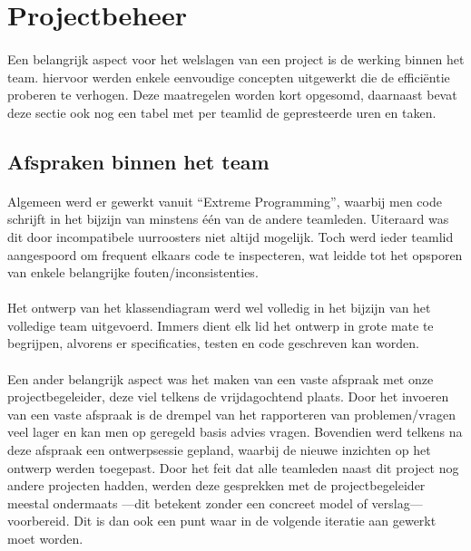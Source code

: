 \section{Projectbeheer}
\label{projectbeheer}
\paragraph{}
Een belangrijk aspect voor het welslagen van een project is de werking binnen het team. hiervoor werden enkele eenvoudige concepten uitgewerkt die de effici\"entie proberen te verhogen. Deze maatregelen worden kort opgesomd, daarnaast bevat deze sectie ook nog een tabel met per teamlid de gepresteerde uren en taken.
\subsection{Afspraken binnen het team}
\paragraph{}
Algemeen werd er gewerkt vanuit ``Extreme Programming'', waarbij men code schrijft in het bijzijn van minstens \'e\'en van de andere teamleden. Uiteraard was dit door incompatibele uurroosters niet altijd mogelijk. Toch werd ieder teamlid aangespoord om frequent elkaars code te inspecteren, wat leidde tot het opsporen van enkele belangrijke fouten/inconsistenties.
\paragraph{}
Het ontwerp van het klassendiagram werd wel volledig in het bijzijn van het volledige team uitgevoerd. Immers dient elk lid het ontwerp in grote mate te begrijpen, alvorens er specificaties, testen en code geschreven kan worden.
\paragraph{}
Een ander belangrijk aspect was het maken van een vaste afspraak met onze projectbegeleider, deze viel telkens de vrijdagochtend plaats. Door het invoeren van een vaste afspraak is de drempel van het rapporteren van problemen/vragen veel lager en kan men op geregeld basis advies vragen. Bovendien werd telkens na deze afspraak een ontwerpsessie gepland, waarbij de nieuwe inzichten op het ontwerp werden toegepast. Door het feit dat alle teamleden naast dit project nog andere projecten hadden, werden deze gesprekken met de projectbegeleider meestal ondermaats ---dit betekent zonder een concreet model of verslag--- voorbereid. Dit is dan ook een punt waar in de volgende iteratie aan gewerkt moet worden.

